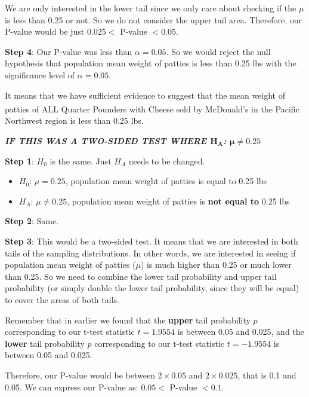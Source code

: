 \documentclass[12pt]{article}
\begin{document}
We are only interested in the lower tail since we only care about checking if the $\mu$ is less than 0.25 or not. So we do not consider the upper tail area. Therefore, our P-value would be just $0.025 <$ P-value $< 0.05$.

\noindent \textbf{Step 4}: Our P-value was less than $\alpha = 0.05$. So we would reject the null hypothesis that population mean weight of patties is less than 0.25 lbs with the significance level of $\alpha = 0.05$. 

It means that we have sufficient evidence to suggest that the mean weight of patties of ALL Quarter Pounders\textsuperscript{\textregistered} with Cheese sold by McDonald's in the Pacific Northwest region is less than 0.25 lbs.

\vspace{10 pt}

\textbf{\textit{IF THIS WAS A TWO-SIDED TEST WHERE $\boldsymbol{H_A}$: $\boldsymbol{\mu \neq 0.25}$}}

\vspace{10 pt}

\noindent \textbf{Step 1}: $H_0$ is the same. Just $H_A$ needs to be changed.
\begin{itemize}
	\item $H_0$: $\mu = 0.25$, population mean weight of patties is equal to 0.25 lbs
	\item $H_A$: $\mu \neq 0.25$, population mean weight of patties is \textbf{not equal to} 0.25 lbs
\end{itemize}

\noindent \textbf{Step 2}: Same.

\noindent \textbf{Step 3}: This would be a two-sided test. It means that we are interested in both tails of the sampling distributions. In other words, we are interested in seeing if population mean weight of patties ($\mu$) is much higher than 0.25 or much lower than 0.25. So we need to combine the lower tail probability and upper tail probability (or simply double the lower tail probability, since they will be equal) to cover the areas of both tails.

Remember that in earlier we found that the \textbf{upper} tail probability $p$ corresponding to our t-test statistic $t = 1.9554$ is between 0.05 and 0.025, and the \textbf{lower} tail probability $p$ corresponding to our t-test statistic $t = -1.9554$ is between 0.05 and 0.025.

Therefore, our P-value would be between $2 \times 0.05$ and $2 \times 0.025$, that is 0.1 and 0.05. We can express our P-value as: $0.05 <$ P-value $< 0.1$.
\end{document}
